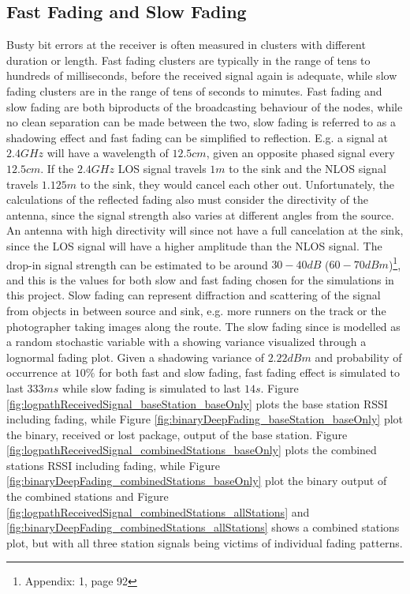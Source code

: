 \subsection{Fast Fading and Slow Fading}%
Busty bit errors at the receiver is often measured in clusters with different duration or length. Fast fading clusters are typically in the range of tens to hundreds of milliseconds, before the received signal again is adequate, while slow fading clusters are in the range of tens of seconds to minutes. Fast fading and slow fading are both biproducts of the broadcasting behaviour of the nodes, while no clean separation can be made between the two, slow fading is referred to as a shadowing effect and fast fading can be simplified to reflection. E.g. a signal at $2.4GHz$ will have a wavelength of $12.5cm$, given an opposite phased signal every $12.5cm$. If the $2.4GHz$ LOS signal travels $1m$ to the sink and the NLOS signal travels $1.125m$ to the sink, they would cancel each other out. Unfortunately, the calculations of the reflected fading also must consider the directivity of the antenna, since the signal strength also varies at different angles from the source. An antenna with high directivity will since not have a full cancelation at the sink, since the LOS signal will have a higher amplitude than the NLOS signal. The drop-in signal strength can be estimated to be around $30-40dB$ ($60-70dBm$)\footnote{Appendix: 1, page 92}, and this is the values for both slow and fast fading chosen for the simulations in this project. Slow fading can represent diffraction and scattering of the signal from objects in between source and sink, e.g. more runners on the track or the photographer taking images along the route. The slow fading since is modelled as a random stochastic variable with a showing variance visualized through a lognormal fading plot. Given a shadowing variance of $2.22dBm$ and probability of occurrence at $10\%$ for both fast and slow fading, fast fading effect is simulated to last $333 ms$ while slow fading is simulated to last $14s$. Figure \ref{fig:logpathReceivedSignal_baseStation_baseOnly} plots the base station RSSI including fading, while Figure \ref{fig:binaryDeepFading_baseStation_baseOnly} plot the binary, received or lost package, output of the base station. Figure \ref{fig:logpathReceivedSignal_combinedStations_baseOnly} plots the combined stations RSSI including fading, while Figure \ref{fig:binaryDeepFading_combinedStations_baseOnly} plot the binary output of the combined stations and Figure \ref{fig:logpathReceivedSignal_combinedStations_allStations} and \ref{fig:binaryDeepFading_combinedStations_allStations} shows a combined stations plot, but with all three station signals being victims of individual fading patterns. 
\clearpage

